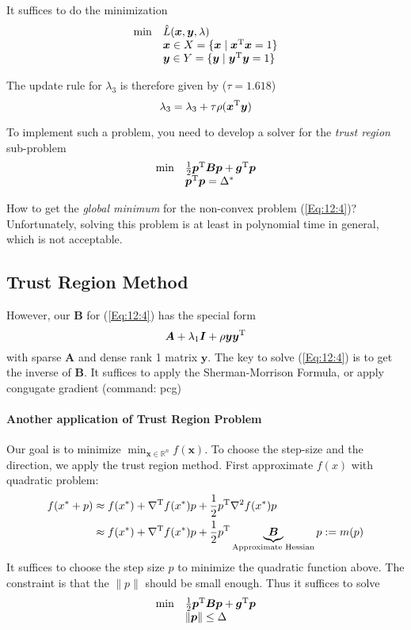 It suffices to do the minimization
\begin{equation}
\begin{array}{ll}
\min&\hat L(\bm x,\bm y,\lambda)\\
&\bm x\in X=\{\bm x\mid \bm x^{\mathrm T}\bm x=1\}\\
&\bm y\in Y=\{\bm y\mid \bm y^{\mathrm T}\bm y=1\}\\
\end{array}
\end{equation}

The update rule for $\lambda_3$ is therefore given by ($\tau=1.618$)
\[
\lambda_3=\lambda_3+\tau\rho(\bm x^{\mathrm T}\bm y)
\]

To implement such a problem, you need to develop a solver for the \emph{trust region} sub-problem
\begin{equation}\label{Eq:12:4}
\begin{array}{ll}
\min&\frac{1}{2}\bm p\trans\bm B\bm p+\bm g\trans\bm p\\
&
\bm p\trans\bm p=\Delta^*
\end{array}
\end{equation}

How to get the \emph{global minimum} for the non-convex problem (\ref{Eq:12:4})? Unfortunately, solving this problem is at least in polynomial time in general, which is not acceptable.


\subsection{Trust Region Method}
However, our $\bm B$ for (\ref{Eq:12:4}) has the special form
\[
\bm A+\lambda_1\bm I+\rho\bm y\bm y^{\mathrm T}
\]
with sparse $\bm A$ and dense rank 1 matrix $\bm y$. The key to solve (\ref{Eq:12:4}) is to get the inverse of $\bm B$. It suffices to apply the Sherman-Morrison Formula, or apply congugate gradient (command: pcg)

\paragraph{Another application of Trust Region Problem}

Our goal is to minimize $\min_{\bm x\in\mathbb{R}^n}f(\bm x)$. To choose the step-size and the direction, we apply the trust region method. First approximate $f(x)$ with quadratic problem:
\begin{align*}
f(x^*+p)&\approx
f(x^*)+\nabla^{\mathrm T} f(x^*)p+\frac{1}{2}p^{\mathrm T}\nabla^2f(x^*)p\\
&\approx
f(x^*)+\nabla^{\mathrm T} f(x^*)p+\frac{1}{2}p^{\mathrm T}\underbrace{\bm B}_{\text{Approximate Hessian}}p:=m(p)
\end{align*}
It suffices to choose the step size $p$ to minimize the quadratic function above. The constraint is that the $\|p\|$ should be small enough. Thus it suffices to solve
\begin{equation}\label{Eq:12:5}
\begin{array}{ll}
\min&\frac{1}{2}\bm p\trans\bm B\bm p+\bm g\trans\bm p\\
&\|\bm p\|\le\Delta
\end{array}
\end{equation}

